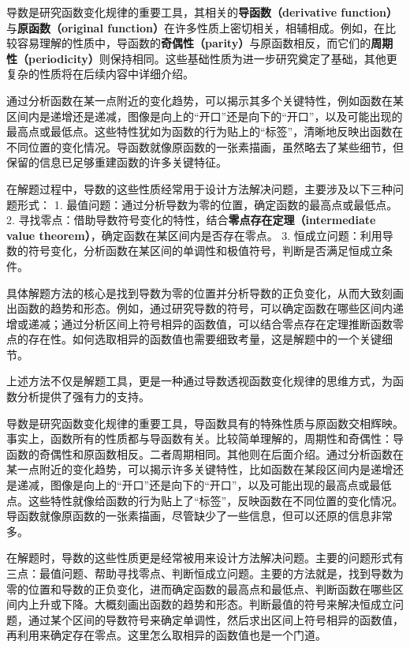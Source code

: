 
\begin{issues}
\issueDraft
\end{issues}


导数是研究函数变化规律的重要工具，其相关的\textbf{导函数（derivative function）}与\textbf{原函数（original function）}在许多性质上密切相关，相辅相成。例如，在比较容易理解的性质中，导函数的\textbf{奇偶性（parity）}与原函数相反，而它们的\textbf{周期性（periodicity）}则保持相同。这些基础性质为进一步研究奠定了基础，其他更复杂的性质将在后续内容中详细介绍。

通过分析函数在某一点附近的变化趋势，可以揭示其多个关键特性，例如函数在某区间内是递增还是递减，图像是向上的“开口”还是向下的“开口”，以及可能出现的最高点或最低点。这些特性犹如为函数的行为贴上的“标签”，清晰地反映出函数在不同位置的变化情况。导函数就像原函数的一张素描画，虽然略去了某些细节，但保留的信息已足够重建函数的许多关键特征。

在解题过程中，导数的这些性质经常用于设计方法解决问题，主要涉及以下三种问题形式：
	1.	最值问题：通过分析导数为零的位置，确定函数的最高点或最低点。
	2.	寻找零点：借助导数符号变化的特性，结合\textbf{零点存在定理（intermediate value theorem）}，确定函数在某区间内是否存在零点。
	3.	恒成立问题：利用导数的符号变化，分析函数在某区间的单调性和极值符号，判断是否满足恒成立条件。

具体解题方法的核心是找到导数为零的位置并分析导数的正负变化，从而大致刻画出函数的趋势和形态。例如，通过研究导数的符号，可以确定函数在哪些区间内递增或递减；通过分析区间上符号相异的函数值，可以结合零点存在定理推断函数零点的存在性。如何选取相异的函数值也需要细致考量，这是解题中的一个关键细节。

上述方法不仅是解题工具，更是一种通过导数透视函数变化规律的思维方式，为函数分析提供了强有力的支持。

导数是研究函数变化规律的重要工具，导函数具有的特殊性质与原函数交相辉映。事实上，函数所有的性质都与导函数有关。比较简单理解的，周期性和奇偶性：导函数的奇偶性和原函数相反。二者周期相同。其他则在后面介绍。通过分析函数在某一点附近的变化趋势，可以揭示许多关键特性，比如函数在某段区间内是递增还是递减，图像是向上的“开口”还是向下的“开口”，以及可能出现的最高点或最低点。这些特性就像给函数的行为贴上了“标签”，反映函数在不同位置的变化情况。导函数就像原函数的一张素描画，尽管缺少了一些信息，但可以还原的信息非常多。

在解题时，导数的这些性质更是经常被用来设计方法解决问题。主要的问题形式有三点：最值问题、帮助寻找零点、判断恒成立问题。主要的方法就是，找到导数为零的位置和导数的正负变化，进而确定函数的最高点和最低点、判断函数在哪些区间内上升或下降。大概刻画出函数的趋势和形态。判断最值的符号来解决恒成立问题，通过某个区间的导数符号来确定单调性，然后求出区间上符号相异的函数值，再利用来确定存在零点。这里怎么取相异的函数值也是一个门道。

